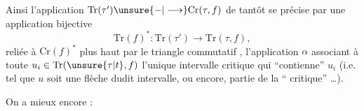 Ainsi l'application $\mathrm{Tr}(\tau')\unsure{\mathbin{-}|\longrightarrow}\mathrm{Cr}(\tau,f)$ de
tantôt se précise par une application bijective
\[
\mathrm{Tr}(f)^*\colon\mathrm{Tr}(\tau')\longrightarrow\mathrm{Tr}(\tau,f),
\]
reliée à $\mathrm{Cr}(f)^*$ plus haut par le triangle
commutatif
,
l'application $\alpha$ associant à toute $u_i\in\mathrm{Tr}(\unsure{\tau|t},f)$
l'unique intervalle critique qui ``contienne'' $u_i$
(i.e. tel que $u$ soit une flèche dudit intervalle,
ou encore,  partie de la `` critique''
\ldots).

On a mieux encore :

